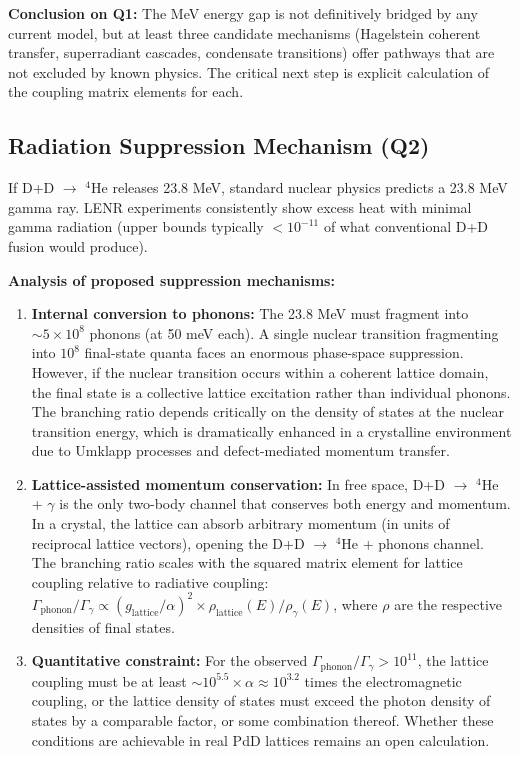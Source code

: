 \documentclass[11pt,a4paper]{article}
\begin{document}
\textbf{Conclusion on Q1:} The MeV energy gap is not definitively bridged by any current model, but at least three candidate mechanisms (Hagelstein coherent transfer, superradiant cascades, condensate transitions) offer pathways that are not excluded by known physics. The critical next step is explicit calculation of the coupling matrix elements for each.

\subsection{Radiation Suppression Mechanism (Q2)}

If D+D $\rightarrow$ $^{4}$He releases 23.8 MeV, standard nuclear physics predicts a 23.8 MeV gamma ray. LENR experiments consistently show excess heat with minimal gamma radiation (upper bounds typically $< 10^{-11}$ of what conventional D+D fusion would produce).

\textbf{Analysis of proposed suppression mechanisms:}

\begin{enumerate}
\def\labelenumi{\arabic{enumi}.}
\item
  \textbf{Internal conversion to phonons:} The 23.8 MeV must fragment into $\sim 5 \times 10^8$ phonons (at 50 meV each). A single nuclear transition fragmenting into $10^8$ final-state quanta faces an enormous phase-space suppression. However, if the nuclear transition occurs within a coherent lattice domain, the final state is a collective lattice excitation rather than individual phonons. The branching ratio depends critically on the density of states at the nuclear transition energy, which is dramatically enhanced in a crystalline environment due to Umklapp processes and defect-mediated momentum transfer.
\item
  \textbf{Lattice-assisted momentum conservation:} In free space, D+D $\rightarrow$ $^{4}$He + $\gamma$ is the only two-body channel that conserves both energy and momentum. In a crystal, the lattice can absorb arbitrary momentum (in units of reciprocal lattice vectors), opening the D+D $\rightarrow$ $^{4}$He + phonons channel. The branching ratio scales with the squared matrix element for lattice coupling relative to radiative coupling: $\Gamma_{\text{phonon}}/\Gamma_{\gamma} \propto (g_{\text{lattice}}/\alpha)^2 \times \rho_{\text{lattice}}(E) / \rho_{\gamma}(E)$, where $\rho$ are the respective densities of final states.
\item
  \textbf{Quantitative constraint:} For the observed $\Gamma_{\text{phonon}}/\Gamma_{\gamma} > 10^{11}$, the lattice coupling must be at least $\sim 10^{5.5} \times \alpha \approx 10^{3.2}$ times the electromagnetic coupling, or the lattice density of states must exceed the photon density of states by a comparable factor, or some combination thereof. Whether these conditions are achievable in real PdD lattices remains an open calculation.
\end{enumerate}
\end{document}
